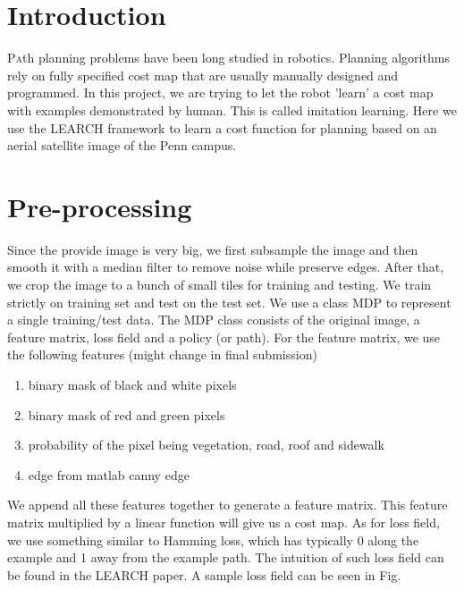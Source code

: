 \documentclass[twoside]{article}
\begin{document}
\begin{multicols}{2} %

\section{Introduction}
\lettrine[nindent=0em,lines=2]{P}ath planning problems have been long studied in robotics. Planning algorithms rely on fully specified cost map that are usually manually designed and programmed. In this project, we are trying to let the robot 'learn' a cost map with examples demonstrated by human. This is called imitation learning. Here we use the LEARCH framework to learn a cost function for planning based on an aerial satellite image of the Penn campus.


\section{Pre-processing}
Since the provide image is very big, we first subsample the image and then smooth it with a median filter to remove noise while preserve edges. After that, we crop the image to a bunch of small tiles for training and testing. We train strictly on training set and test on the test set. 
We use a class MDP to represent a single training/test data. The MDP class consists of the original image, a feature matrix, loss field and a policy (or path). 
For the feature matrix, we use the following features (might change in final submission)
\begin{enumerate}
\item binary mask of black and white pixels
\item binary mask of red and green pixels
\item probability of the pixel being vegetation, road, roof and sidewalk
\item edge from matlab canny edge
\end{enumerate}
We append all these features together to generate a feature matrix. This feature matrix multiplied by a linear function will give us a cost map.
As for loss field, we use something similar to Hamming loss, which has typically 0 along the example and 1 away from the example path. The intuition of such loss field can be found in the LEARCH paper. A sample loss field can be seen in Fig.


\end{multicols}
\end{document}
